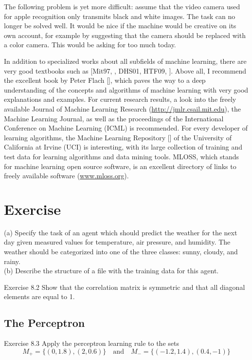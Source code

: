 \documentclass[10pt]{book}
\begin{document}
The following problem is yet more difficult: assume that the video camera used for apple recognition only transmits black and white images. The task can no longer be solved well. It would be nice if the machine would be creative on its own account, for example by suggesting that the camera should be replaced with a color camera. This would be asking for too much today.

In addition to specialized works about all subfields of machine learning, there are very good textbooks such as [Mit97, \cite{bishop2006prml}, DHS01, HTF09, \cite{alpaydin2004introduction}]. Above all, I recommend the excellent book by Peter Flach [\cite{flach2012machine}], which paves the way to a deep understanding of the concepts and algorithms of machine learning with very good explanations and examples. For current research results, a look into the freely available Journal of Machine Learning Research (\href{http://jmlr.csail.mit.edu}{http://jmlr.csail.mit.edu}), the Machine Learning Journal, as well as the proceedings of the International Conference on Machine Learning (ICML) is recommended. For every developer of learning algorithms, the Machine Learning Repository [\cite{blake1998uci}] of the University of California at Irvine (UCI) is interesting, with its large collection of training and test data for learning algorithms and data mining tools. MLOSS, which stands for machine learning open source software, is an excellent directory of links to freely available software (\href{http://www.mloss.org}{www.mloss.org}).

\section{Exercise}
(a) Specify the task of an agent which should predict the weather for the next day given measured values for temperature, air pressure, and humidity. The weather should be categorized into one of the three classes: sunny, cloudy, and rainy.\\
(b) Describe the structure of a file with the training data for this agent.

Exercise 8.2 Show that the correlation matrix is symmetric and that all diagonal elements are equal to 1.

\subsection{The Perceptron}
Exercise 8.3 Apply the perceptron learning rule to the sets
$$
M_{+}=\{(0,1.8),(2,0.6)\} \quad \text{and} \quad M_{-}=\{(-1.2,1.4),(0.4,-1)\}
$$
\end{document}
